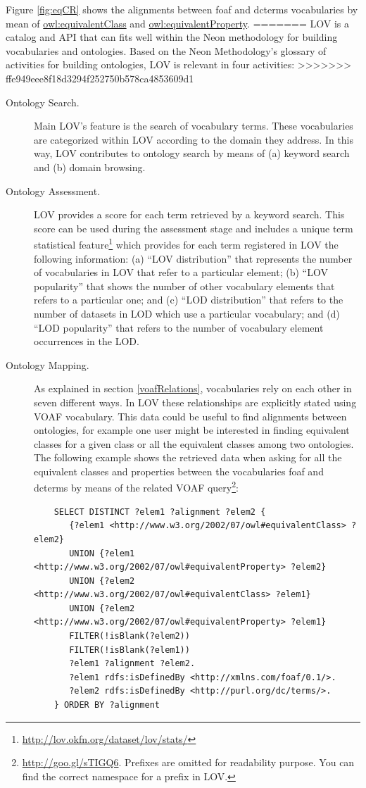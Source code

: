 \begin{description}
	Figure \ref{fig:eqCR} shows the alignments between foaf and dcterms vocabularies by mean of \url{owl:equivalentClass} and \url{owl:equivalentProperty}. 
=======
LOV is a catalog and API that can fits well within the Neon methodology for building vocabularies and ontologies. Based on the Neon Methodology's glossary of activities for building ontologies, LOV is relevant in four activities:
>>>>>>> ffe949eee8f18d3294f252750b578ca4853609d1

\begin{description}%
 \item [Ontology Search.] Main LOV's feature is the search of vocabulary terms. These vocabularies are categorized within LOV according to the domain they address. In this way, LOV contributes to ontology search by means of (a) keyword search and (b) domain browsing.
 \item [Ontology Assessment.] LOV provides a score for each term retrieved by a keyword search. This score can be used during the assessment stage and includes a unique term statistical feature\footnote{\url{http://lov.okfn.org/dataset/lov/stats/}} which provides for each term registered in LOV the following information: (a) ``LOV distribution'' that represents the number of vocabularies in LOV that refer to a particular element; (b) ``LOV popularity'' that shows the number of other vocabulary elements that refers to a particular one; and (c) ``LOD distribution'' that refers to the number of datasets in LOD which use a particular vocabulary; and (d) ``LOD popularity'' that refers to the number of vocabulary element occurrences in the LOD.
 \item [Ontology Mapping.] As explained in section \ref{voafRelations}, vocabularies rely on each other in seven different ways. In LOV these relationships are explicitly stated using VOAF vocabulary. This data could be useful to find alignments between ontologies, for example one user might be interested in finding equivalent classes for a given class or all the equivalent classes among two ontologies. The following example shows the retrieved data when asking for all the equivalent classes and properties between the vocabularies foaf and dcterms by means of the related VOAF query\footnote{\url{http://goo.gl/sTIGQ6}. Prefixes are omitted for readability purpose. You can find the correct namespace for a prefix in LOV.}:
     
	{\small\begin{verbatim}
    SELECT DISTINCT ?elem1 ?alignment ?elem2 {
	   {?elem1 <http://www.w3.org/2002/07/owl#equivalentClass> ?elem2}
	   UNION {?elem1 <http://www.w3.org/2002/07/owl#equivalentProperty> ?elem2}
	   UNION {?elem2 <http://www.w3.org/2002/07/owl#equivalentClass> ?elem1}
	   UNION {?elem2 <http://www.w3.org/2002/07/owl#equivalentProperty> ?elem1}
	   FILTER(!isBlank(?elem2))
	   FILTER(!isBlank(?elem1))
	   ?elem1 ?alignment ?elem2.
	   ?elem1 rdfs:isDefinedBy <http://xmlns.com/foaf/0.1/>.
	   ?elem2 rdfs:isDefinedBy <http://purl.org/dc/terms/>.
	} ORDER BY ?alignment\end{verbatim}}
	

\end{description}
\end{description}
